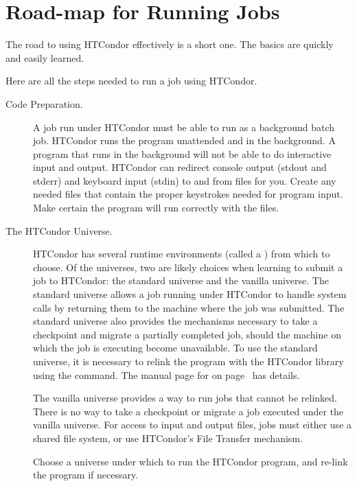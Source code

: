 \section{Road-map for Running Jobs}

The road to using HTCondor effectively is a short one.  The basics
are quickly and easily learned.

Here are all the steps needed to run a job using HTCondor.
\begin{description}

\item[Code Preparation.]
A job run under HTCondor must be able to 
run as a background batch job.
HTCondor runs the program unattended and in the background. 
A program that runs in the background will not be able
to do interactive input and output.
HTCondor can redirect console output (stdout and stderr)
and keyboard input (stdin)
to and from files for you.
Create any needed files that contain
the proper keystrokes needed for program input.
Make certain the program will run correctly with the files.

\item[The HTCondor Universe.]
HTCondor has several 
runtime environments (called a ) from which to choose.
Of the universes, two are likely choices when learning
to submit a job to HTCondor: the standard universe and the vanilla universe.
The standard universe allows a job running under HTCondor to
handle system calls by returning them to the machine where the
job was submitted.
The standard universe also provides the mechanisms necessary
to take a checkpoint and migrate a partially completed job,
should the machine on which the job is executing become
unavailable.
To use the standard universe, it is necessary to
relink the program with the HTCondor library using the
 command.
The manual page for  on page~\pageref{man-condor-compile} has details.

The vanilla universe provides a way to run jobs that cannot be
relinked.
There is no way to take a checkpoint or migrate a job executed
under the vanilla universe.
For access to input and output files, jobs must either use a shared
file system, or use HTCondor's File Transfer mechanism.

Choose a universe under which to run the HTCondor program,
and re-link the program if necessary.


\end{description}

